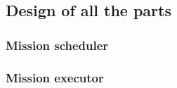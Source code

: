 \documentclass[main.tex]{subfiles}
\begin{document}
\subsection{Design of all the parts}

\subsubsection{Mission scheduler}

\subsubsection{Mission executor}
\end{document}
